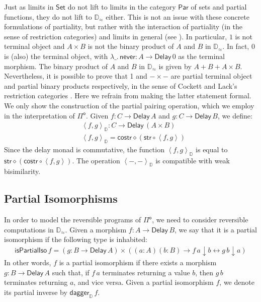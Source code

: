 \documentclass[runningheads,a4paper]{llncs}
\newcommand{\Pio}{\ensuremath{\mathsf{\Pi}^{\mathsf{o}}}}
\newcommand{\Set}{\mathsf{Set}}
\newcommand{\Par}{\mathsf{Par}}
\newcommand{\comp}{\circ}
\newcommand{\pair}[2]{\left< #1,#2 \right>}
\newcommand{\Delay}{\ensuremath{\mathsf{Delay}\,}}
\newcommand{\never}{\mathsf{never}}
\newcommand{\dn}{\downarrow}
\newcommand{\str}{\mathsf{str}}
\newcommand{\costr}{\mathsf{costr}}
\newcommand{\D}{\mathbb{D}}
\newcommand{\Dapprox}{\mathbb{D}_{\approx}}
\newcommand{\pairD}[2]{\left< #1,#2 \right>_{\D}}
\newcommand{\piso}{\mathsf{isPartialIso}}
\newcommand{\daggerD}{\mathsf{dagger}_\D}
\begin{document}
Just as limits in $\Set$ do not lift to limits in the category $\Par$ of sets
and partial functions, they do not lift to $\Dapprox$ either. This is not an
issue with these concrete formulations of partiality, but rather with the
interaction of partiality (in the sense of restriction categories) and limits
in general (see \cite[Section 4.4]{CockettL07}). In particular, $1$ is not
terminal object and $A \times B$ is not the binary product of $A$ and $B$ in
$\Dapprox$. In fact, $0$ is (also) the terminal object, with $\lambda \_.\,
\never : A \to \Delay 0$ as the terminal morphism. The
binary product of $A$ and $B$ in $\Dapprox$ is given by
$A + B + A \times B$. Nevertheless, it is possible to prove that 1 and
$- \times -$ are partial terminal object and partial binary products
respectively, in the sense of Cockett and Lack's restriction
categories \cite{CockettL02,CockettL07}. Here we refrain from making the latter
statement formal. We only show the construction of the partial pairing
operation, which we employ in the interpretation of \Pio.  Given
$f : C \to \Delay A$ and $g : C \to \Delay B$, we define:
\begin{align*}
& \pairD f g : C \to \Delay (A \times B) \\
& \pairD f g = \costr \diamond (\str \comp \pair f g)
\end{align*}
Since the delay monad is commutative, the function $\pairD f g$ is
equal to $\str \diamond (\costr \comp \pair f g)$. The operation
$\pairD - -$ is compatible with weak bisimilarity.

\subsection{Partial Isomorphisms}
\label{sec:isos}

In order to model the reversible programs of \Pio, we need to consider
reversible computations in $\Dapprox$. Given a morphism $f : A \to
\Delay B$, we say that it is a partial isomorphism if the following
type is inhabited:
\begin{align*}
\piso \,f = (g : B \to \Delay A) \times \left( (a : A) (b : B) \to  f
  \,a \dn b \leftrightarrow g \,b \dn a  \right)  
\end{align*}
In other words, $f$ is a partial isomorphism if there exists a
morphism $g : B \to \Delay A$ such that, if $f\,a$ terminates
returning a value $b$, then $g\,b$ terminates returning $a$, and vice
versa. Given a partial isomorphism $f$, we denote its partial inverse
by $\daggerD\,f$.
\end{document}
